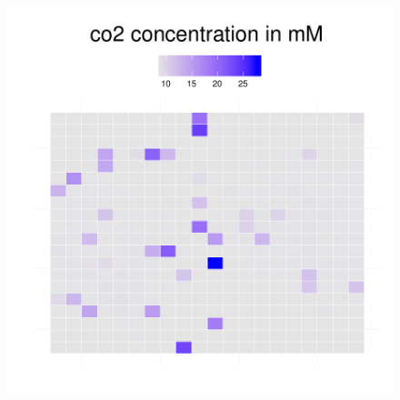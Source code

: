 \begin{figure}[h]
{\begin{minipage}[t]{0.3\textwidth}
  \end{minipage}
  \begin{minipage}[t]{0.3\textwidth}
    \includegraphics[width=\textwidth]{../results/barkeri_20x20_seed9659_co2130.pdf}
  \end{minipage}
  }
\end{figure}
